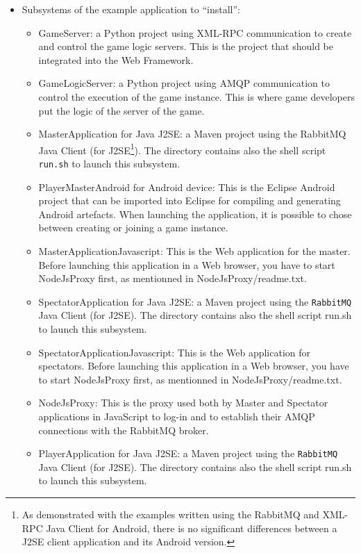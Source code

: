 \begin{itemize}
\item Subsystems of the example application to ``install'':
\begin{itemize}
\item \textsf{GameServer}: a Python project using XML-RPC
  communication to create and control the game logic servers. This is
  the project that should be integrated into the Web Framework.
\item \textsf{GameLogicServer}: a Python project using AMQP
  communication to control the execution of the game instance. This is
  where game developers put the logic of the server of the game.
\item \textsf{MasterApplication} for Java J2SE: a Maven project using
  the \textsf{RabbitMQ} Java Client (for J2SE\footnote{As demonstrated
    with the examples written using the \textsf{RabbitMQ} and
    \textsf{XML-RPC} Java Client for Android, there is no significant
    differences between a J2SE client application and its Android
    version.}). The directory contains also the shell script
  \texttt{run.sh} to launch this subsystem.
\item \textsf{PlayerMasterAndroid} for Android device: This is the
  Eclipse Android project that can be imported into Eclipse for
  compiling and generating Android artefacts. When launching the
  application, it is possible to chose between creating or joining a
  game instance.
\item \textsf{MasterApplicationJavascript}: This is the Web application
  for the master. Before launching this application in a Web browser, 
  you have to start NodeJsProxy first, as mentionned in 
  NodeJsProxy/readme.txt.
\item \textsf{SpectatorApplication} for Java J2SE: a Maven project
  using the \texttt{RabbitMQ} Java Client (for J2SE). The directory
  contains also the shell script \textsf{run.sh} to launch this
  subsystem.
\item \textsf{SpectatorApplicationJavascript}: This is the Web application
  for spectators. Before launching this application in a Web browser, 
  you have to start NodeJsProxy first, as mentionned in 
  NodeJsProxy/readme.txt.
\item \textsf{NodeJsProxy}: This is the proxy used both by Master and 
  Spectator applications in JavaScript to log-in and to 
  establish their AMQP connections with the  RabbitMQ broker.
\item \textsf{PlayerApplication} for Java J2SE: a Maven project using
  the \texttt{RabbitMQ} Java Client (for J2SE). The directory contains
  also the shell script \textsf{run.sh} to launch this subsystem.
\end{itemize}
\end{itemize}

